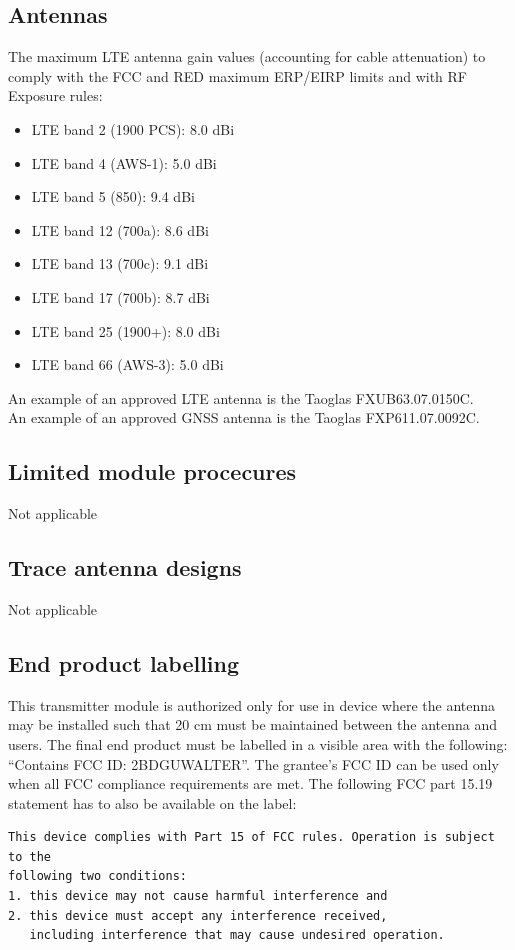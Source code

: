 \documentclass[11pt]{article}
\begin{document}
\subsection{Antennas}
The maximum LTE antenna gain values (accounting for cable attenuation) to comply with the FCC and RED maximum ERP/EIRP limits and with RF Exposure rules:
\begin{itemize}
	\item LTE band 2 (1900 PCS): 8.0 dBi
	\item LTE band 4 (AWS-1): 5.0 dBi
	\item LTE band 5 (850): 9.4 dBi
	\item LTE band 12 (700a): 8.6 dBi
	\item LTE band 13 (700c): 9.1 dBi
	\item LTE band 17 (700b): 8.7 dBi
	\item LTE band 25 (1900+): 8.0 dBi
	\item LTE band 66 (AWS-3): 5.0 dBi
\end{itemize}

An example of an approved LTE antenna is the Taoglas FXUB63.07.0150C. \\


An example of an approved GNSS antenna is the Taoglas FXP611.07.0092C.

\subsection{Limited module procecures}
Not applicable

\subsection{Trace antenna designs}
Not applicable

\subsection{End product labelling}
This transmitter module is authorized only for use in device where the antenna may be installed such that 20 cm must be maintained between the antenna and users. The final end product must be labelled in a visible area with the following: “Contains FCC ID: 2BDGUWALTER”. The grantee’s FCC ID can be used only when all FCC compliance requirements are met. The following FCC part 15.19 statement has to also be available on the label:

\begin{verbatim}
This device complies with Part 15 of FCC rules. Operation is subject to the
following two conditions:
1. this device may not cause harmful interference and
2. this device must accept any interference received,
   including interference that may cause undesired operation.
\end{verbatim}
\end{document}
